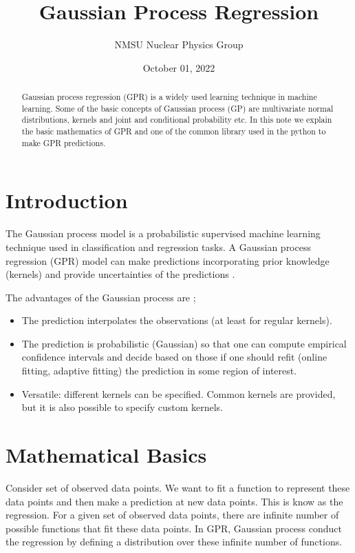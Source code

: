 \documentclass{article}
\title{Gaussian Process Regression}
\author{NMSU Nuclear Physics Group}
\date{October 01, 2022}
\begin{document}
\maketitle

\begin{abstract}
Gaussian process regression (GPR) is a widely used learning technique in machine learning. Some of the basic concepts of Gaussian process (GP) are multivariate normal distributions, kernels and joint and conditional probability etc. In this note we explain the basic mathematics of GPR and one of the common library used in the python to make GPR predictions.
\end{abstract}

\section{Introduction}

The Gaussian process model is a probabilistic supervised machine learning technique used in classification and regression tasks. A Gaussian process regression (GPR) model can make predictions incorporating prior knowledge (kernels) and provide uncertainties of the predictions \cite{10.7551/mitpress/3206.001.0001}.

The advantages of the Gaussian process are \cite{scikit-learn};

\begin{itemize}
\item The prediction interpolates the observations (at least for regular kernels).
\item The prediction is probabilistic (Gaussian) so that one can compute empirical confidence intervals and decide based on those if one should refit (online fitting, adaptive fitting) the prediction in some region of interest.
\item Versatile: different kernels can be specified. Common kernels are provided, but it is also possible to specify custom kernels.
\end{itemize}

\section{Mathematical Basics}

Consider set of observed data points. We want to fit a function to represent these data points and then make a prediction at new data points. This is know as the regression. For a given set of observed data points, there are infinite number of possible functions that fit these data points. In GPR, Gaussian process conduct the regression by defining a distribution over these infinite number of functions.
\end{document}
